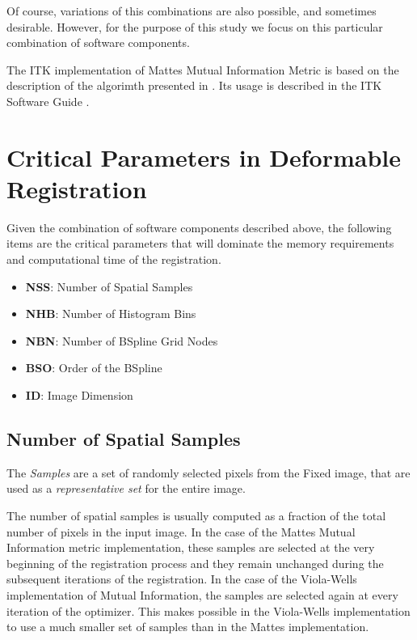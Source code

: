 \documentclass{InsightArticle}
\begin{document}
Of course, variations of this combinations are also possible, and sometimes
desirable. However, for the purpose of this study we focus on this particular
combination of software components.

The ITK implementation of Mattes Mutual Information Metric is based on the
description of the algorimth presented in \cite{Mattes2001,Mattes2003}. Its
usage is described in the ITK Software Guide
\cite{ITKSoftwareGuideSecondEdition}.


\section{Critical Parameters in Deformable Registration}
\label{sec:CriticalParameters}

Given the combination of software components described above, the following
items are the critical parameters that will dominate the memory requirements
and computational time of the registration.

\begin{itemize}
\item \textbf{NSS}: Number of Spatial Samples
\item \textbf{NHB}: Number of Histogram Bins
\item \textbf{NBN}: Number of BSpline Grid Nodes
\item \textbf{BSO}: Order of the BSpline
\item \textbf{ID}:  Image Dimension
\end{itemize}

\subsection{Number of Spatial Samples}

The \emph{Samples} are a set of randomly selected pixels from the Fixed image,
that are used as a \emph{representative set} for the entire image.

The number of spatial samples is usually computed as a fraction of the total
number of pixels in the input image.  In the case of the Mattes Mutual
Information metric implementation, these samples are selected at the very
beginning of the registration process and they remain unchanged during the
subsequent iterations of the registration. In the case of the Viola-Wells
implementation of Mutual Information, the samples are selected again at every
iteration of the optimizer. This makes possible in the Viola-Wells
implementation to use a much smaller set of samples than in the Mattes
implementation.
\end{document}
